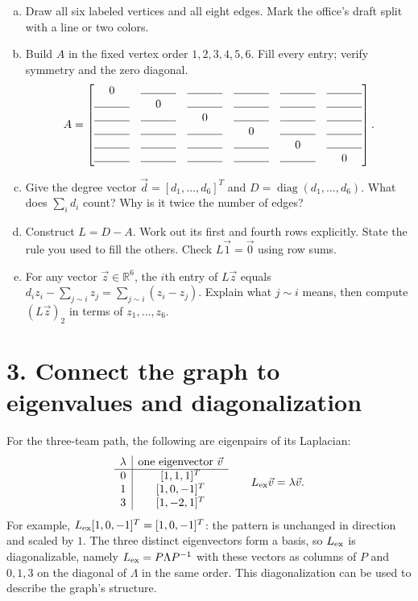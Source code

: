 \documentclass[10pt,letterpaper]{article}
\newcommand{\blank}{\rule{1.1cm}{0.4pt}}
\begin{document}
\begin{enumerate}[a.,leftmargin=*]
\item Draw all six labeled vertices and all eight edges. Mark the office's draft split with a line or two colors.\\[1.20in]
\item Build $A$ in the fixed vertex order $1,2,3,4,5,6$. Fill every entry; verify symmetry and the zero diagonal.
\[
A=\begin{bmatrix}
0&\blank&\blank&\blank&\blank&\blank\\
\blank&0&\blank&\blank&\blank&\blank\\
\blank&\blank&0&\blank&\blank&\blank\\
\blank&\blank&\blank&0&\blank&\blank\\
\blank&\blank&\blank&\blank&0&\blank\\
\blank&\blank&\blank&\blank&\blank&0
\end{bmatrix}.
\]
\item Give the degree vector $\vec d=[d_1,\ldots,d_6]^T$ and $D=\operatorname{diag}(d_1,\ldots,d_6)$. What does $\sum_i d_i$ count? Why is it twice the number of edges?\\[0.45in]
\item Construct $L=D-A$. Work out its first and fourth rows explicitly. State the rule you used to fill the others. Check $L\vec{1}=\vec{0}$ using row sums.\\[0.85in]
\item For any vector $\vec z\in\mathbb R^6$, the $i$th entry of $L\vec z$ equals $d_i z_i-\sum_{j\sim i}z_j=\sum_{j\sim i}(z_i-z_j)$. Explain what $j\sim i$ means, then compute $(L\vec z)_2$ in terms of $z_1,\ldots,z_6$.\\[0.5in]
\end{enumerate}

\newpage
\section*{3. Connect the graph to eigenvalues and diagonalization}
 For the three-team path, the following are eigenpairs of its Laplacian:
\[
\begin{array}{c|c}
\lambda&\text{one eigenvector }\vec v\\\hline
0&[1,1,1]^T\\
1&[1,0,-1]^T\\
3&[1,-2,1]^T
\end{array}
\qquad L_{\rm ex}\vec v=\lambda\vec v.
\]
For example, $L_{\rm ex}[1,0,-1]^T=[1,0,-1]^T$: the pattern is unchanged in direction and scaled by $1$. The three distinct eigenvectors form a basis, so $L_{\rm ex}$ is diagonalizable, namely  $L_{\rm ex}=P\Lambda P^{-1}$ with these vectors as columns of $P$ and $0,1,3$ on the diagonal of $\Lambda$ in the same order. This diagonalization can be used to describe the graph's structure.
\end{document}
